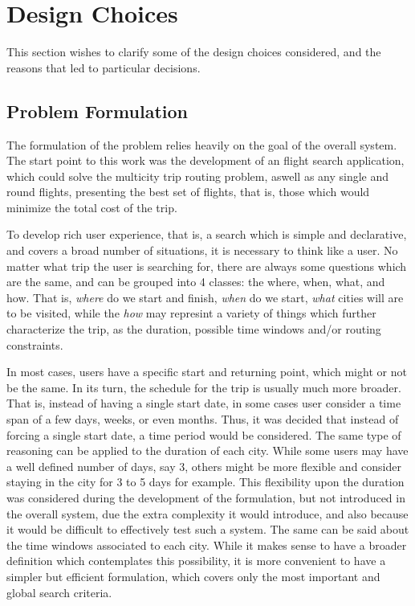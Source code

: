 \section{Design Choices}
This section wishes to clarify some of the design choices considered, and the reasons that led to  particular decisions.



\subsection{Problem Formulation}
The formulation of the problem relies heavily on the goal of the overall system.
The start point to this work was the development of an flight search application,
which could solve the multicity trip routing problem,
aswell as any single and round flights,
presenting the best set of flights, that is, those which would minimize 
the total cost of the trip.

To develop rich user experience, that is, a search which is simple and declarative,
and covers a broad number of situations, it is necessary to think like a user.
No matter what trip the user is searching for, there are always some questions which are the same,
and can be grouped into 4 classes: the where, when,  what, and  how.
That is, \textit{where} do we start and finish, 
\textit{when} do we start, \textit{what} cities will are to be visited,
while the \textit{how} may represint a variety of things 
which further characterize the trip, as the duration, possible time windows and/or routing constraints.

In most cases, users have a specific start and returning point, which might or not be the same.
In its turn, the schedule for the trip is usually much more broader.
That is, instead of having a single start date, in some cases user consider a time span of a few days, weeks, or even months. 
Thus, it was decided that instead of forcing a single start date, 
a time period would be considered. 
The same type of reasoning can be applied to the duration of each city.
While some users may have a well defined number of days, say 3,
others might be more flexible and consider staying in the city for 3 to 5 days for example.
This flexibility upon the duration was considered during the development of the formulation,
but not introduced in the overall system, due the extra complexity it would introduce,
and also because it would be difficult to effectively test such a system.
The same can be said about the time windows associated to each city.
While it makes sense to have a broader definition which contemplates
this possibility, it is more convenient to have a simpler but efficient formulation,
which covers only the most important and global search criteria.




